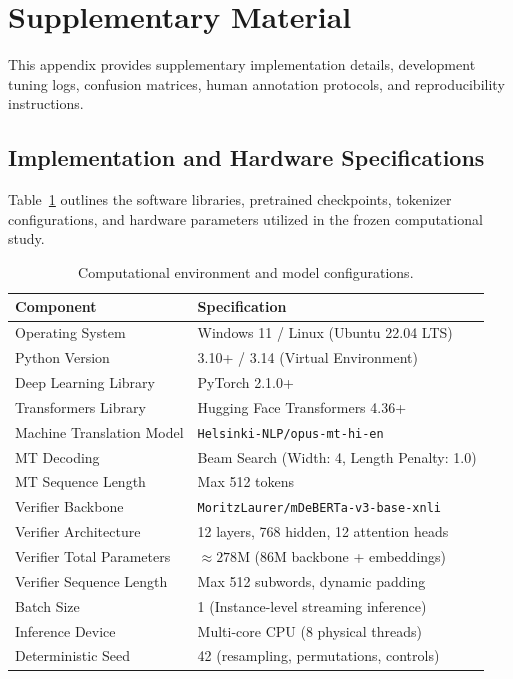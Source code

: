\appendix
\section{Supplementary Material}
\label{sec:supplementary}

This appendix provides supplementary implementation details, development tuning logs, confusion matrices, human annotation protocols, and reproducibility instructions.

\subsection{Implementation and Hardware Specifications}
\label{sec:app_hardware}
Table~\ref{tab:app_specs} outlines the software libraries, pretrained checkpoints, tokenizer configurations, and hardware parameters utilized in the frozen computational study.

\begin{table}[h]
\centering
\small
\begin{tabular}{ll}
\toprule
\textbf{Component} & \textbf{Specification} \\
\midrule
Operating System & Windows 11 / Linux (Ubuntu 22.04 LTS) \\
Python Version & 3.10+ / 3.14 (Virtual Environment) \\
Deep Learning Library & PyTorch 2.1.0+ \\
Transformers Library & Hugging Face Transformers 4.36+ \\
Machine Translation Model & \texttt{Helsinki-NLP/opus-mt-hi-en} \\
MT Decoding & Beam Search (Width: 4, Length Penalty: 1.0) \\
MT Sequence Length & Max 512 tokens \\
Verifier Backbone & \texttt{MoritzLaurer/mDeBERTa-v3-base-xnli} \\
Verifier Architecture & 12 layers, 768 hidden, 12 attention heads \\
Verifier Total Parameters & $\approx 278$M (86M backbone + embeddings) \\
Verifier Sequence Length & Max 512 subwords, dynamic padding \\
Batch Size & 1 (Instance-level streaming inference) \\
Inference Device & Multi-core CPU (8 physical threads) \\
Deterministic Seed & 42 (resampling, permutations, controls) \\
\bottomrule
\end{tabular}
\caption{Computational environment and model configurations.}
\label{tab:app_specs}
\end{table}

